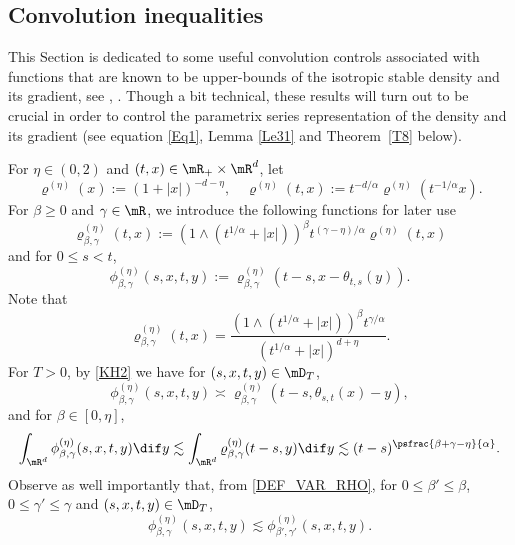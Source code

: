 \subsection{Convolution inequalities}
This Section is dedicated to some useful convolution controls associated with functions that are known to be upper-bounds of the isotropic stable density and its gradient, see \eg \cite{kolo:00}, \cite{Bo-Ja}. Though a bit technical, these results will turn out to be crucial in order to control the parametrix series representation of the density and its gradient (see \eg equation \eqref{Eq1}, Lemma \ref{Le31} and Theorem~\ref{T8} below).

For $\eta\in(0,2)$ and $(t,x)\in\mR_+\times\mR^d$, let
\[
\varrho^{(\eta)}(x):=(1+|x|)^{-d-\eta},\quad \varrho^{(\eta)}(t,x):=t^{-d/\alpha}\varrho^{(\eta)}(t^{-1/\alpha}x).
\]
For $\beta\geq 0$ and $\gamma\in\mR$, we introduce the following functions for later use
\begin{equation}\label{DEF_VAR_RHO}
\varrho^{(\eta)}_{\beta,\gamma}(t,x):=(1\wedge (t^{1/\alpha}+|x|))^\beta t^{(\gamma-\eta)/\alpha}\varrho^{(\eta)}(t,x)
\end{equation}
and for $0\leq s<t$,
\begin{equation}
\label{DEF_PHI}
\phi^{(\eta)}_{\beta,\gamma}(s,x,t,y):=\varrho^{(\eta)}_{\beta,\gamma}(t-s,x-\theta_{t,s}(y)).
\end{equation}
Note that
\[
\varrho^{(\eta)}_{\beta,\gamma}(t,x)=\frac{(1\wedge (t^{1/\alpha}+|x|))^\beta t^{\gamma/\alpha}}{(t^{1/\alpha}+|x|)^{d+\eta}}.
\]
For $T>0$, by \eqref{KH2} we have for $(s,x,t,y)\in\mD_T$,
\begin{equation}\label{ES44}
\phi^{(\eta)}_{\beta,\gamma}(s,x,t,y)\asymp \varrho^{(\eta)}_{\beta,\gamma}(t-s,\theta_{s,t}(x)-y),
\end{equation}
and for $\beta\in[0,\eta]$,
\begin{equation}
\int_{\mR^d}\phi^{(\eta)}_{\beta,\gamma}(s,x,t,y)\dif y
\lesssim\int_{\mR^d}\varrho^{(\eta)}_{\beta,\gamma}(t-s,y)\dif y
\lesssim (t-s)^{\psfrac{\beta+\gamma-\eta}{\alpha}}.\label{ES4}
\end{equation}
{Observe as well importantly that, from \eqref{DEF_VAR_RHO}, for $0\le \beta'\le \beta $, $0\le \gamma'\le \gamma $
and $(s,x,t,y)\in\mD_T$,\vspace*{-3pt}
\begin{equation}
\label{DOM_STAB}
\phi^{(\eta)}_{\beta,\gamma}(s,x,t,y)\lesssim \phi^{(\eta)}_{\beta',\gamma'}(s,x,t,y).
\end{equation}
}
